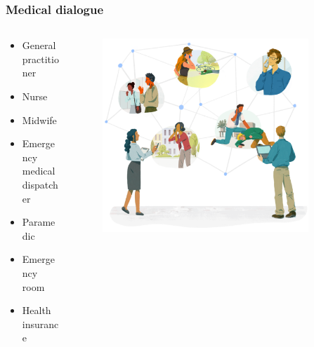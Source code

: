 \begin{frame}[t]
    \frametitle{Medical dialogue}
    \begin{columns}[t]
        \begin{column}{0.4\textwidth}
            \begin{itemize}
                \item <2> General practitioner
                \item <2> Nurse
                \item <2> Midwife
                \item <2> Emergency medical dispatcher
                \item <2> Paramedic
                \item <2> Emergency room
                \item <2> Health insurance
            \end{itemize}
        \end{column}
        \begin{column}{0.6\textwidth}
            \vspace{-2em}
            \begin{figure}[t]
                \centering
                \includegraphics[width=0.9\textwidth]{figures/corti_sketch_conversations.png}
            \end{figure}
        \end{column}
    \end{columns}
\end{frame}


